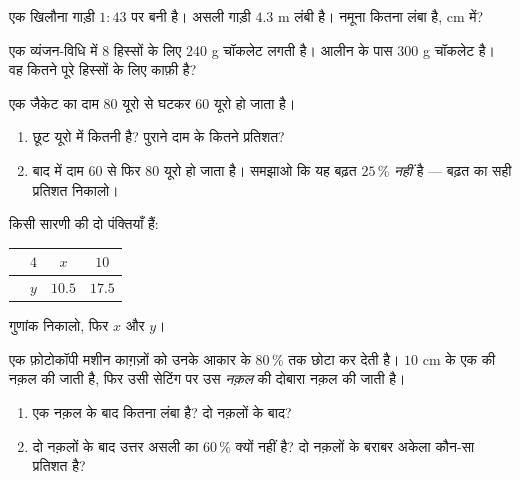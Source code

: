 \begin{exercise}[$\star$]\label{exo:g7:prop:7}
एक खिलौना गाड़ी $1 : 43$  पर बनी है। असली गाड़ी $4.3$ m लंबी
है। नमूना कितना लंबा है, cm में?
\end{exercise}

\begin{exercise}[$\star\star$]\label{exo:g7:prop:8}
एक व्यंजन-विधि में $8$ हिस्सों के लिए $240$ g चॉकलेट लगती है। आलीन
के पास $300$ g चॉकलेट है। वह कितने पूरे हिस्सों के लिए काफ़ी है?
\end{exercise}

\begin{exercise}[$\star\star$]\label{exo:g7:prop:9}
एक जैकेट का दाम $80$ यूरो से घटकर $60$ यूरो हो जाता है।
\begin{enumerate}
  \item छूट यूरो में कितनी है? पुराने दाम के कितने प्रतिशत?
  \item बाद में दाम $60$ से फिर $80$ यूरो हो जाता है। समझाओ कि यह
        बढ़त $25\,\%$ \emph{नहीं} है --- बढ़त का सही प्रतिशत
        निकालो।
\end{enumerate}
\end{exercise}

\begin{exercise}[$\star\star$]\label{exo:g7:prop:10}
किसी सारणी की दो पंक्तियाँ  हैं:
\begin{center}
\renewcommand{\arraystretch}{1.2}
\begin{tabular}{l|ccc}
 & $4$ & $x$ & $10$ \\
\hline
 & $y$ & $10.5$ & $17.5$ \\
\end{tabular}
\end{center}
गुणांक निकालो, फिर $x$ और $y$।
\end{exercise}

\begin{exercise}[$\star\star\star$]\label{exo:g7:prop:11}
एक फ़ोटोकॉपी मशीन काग़ज़ों को उनके आकार के $80\,\%$ तक छोटा कर देती
है। $10$ cm के एक  की नक़ल की जाती है, फिर उसी सेटिंग पर उस
\emph{नक़ल} की दोबारा नक़ल की जाती है।
\begin{enumerate}
  \item एक नक़ल के बाद  कितना लंबा है? दो नक़लों के बाद?
  \item दो नक़लों के बाद उत्तर असली का $60\,\%$ क्यों नहीं है? दो
        नक़लों के बराबर अकेला कौन-सा प्रतिशत है?
\end{enumerate}
\end{exercise}

